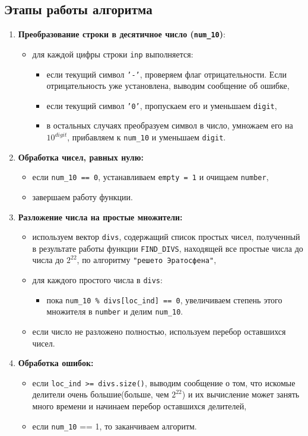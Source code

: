 \subsection*{Этапы работы алгоритма}
\begin{enumerate}
	\item \textbf{Преобразование строки в десятичное число (\texttt{num\_10})}:
	\begin{itemize}
		\item для каждой цифры строки \texttt{inp} выполняется:
		\begin{itemize}
			\item если текущий символ \texttt{'-'}, проверяем флаг отрицательности. Если отрицательность уже установлена, выводим сообщение об ошибке,
			\item если текущий символ \texttt{'0'}, пропускаем его и уменьшаем \texttt{digit},
			\item в остальных случаях преобразуем символ в число, умножаем его на $10^{digit}$, прибавляем к \texttt{num\_10} и уменьшаем \texttt{digit}.
		\end{itemize}
	\end{itemize}
	
	\item \textbf{Обработка чисел, равных нулю:}
	\begin{itemize}
		\item если \texttt{num\_10 == 0}, устанавливаем \texttt{empty = 1} и очищаем \texttt{number},
		\item завершаем работу функции.
	\end{itemize}
	
	\item \textbf{Разложение числа на простые множители:}
	\begin{itemize}
		\item используем вектор \texttt{divs}, содержащий список простых чисел, полученный в результате работы функции \texttt{FIND\_DIVS}, находящей все простые числа до числа до $2^{22}$, по алгоритму \texttt{"решето Эратосфена"},
		\item для каждого простого числа в \texttt{divs}:
		\begin{itemize}
			\item пока \texttt{num\_10 \% divs[loc\_ind] == 0}, увеличиваем степень этого множителя в \texttt{number} и делим \texttt{num\_10}.
		\end{itemize}
		\item если число не разложено полностью, используем перебор оставшихся чисел.
	\end{itemize}
	
	\item \textbf{Обработка ошибок:}
	\begin{itemize}
		\item если \texttt{loc\_ind >= divs.size()}, выводим сообщение о том, что искомые делители очень большие(больше, чем $2^{22}$) и их вычисление может занять много времени и начинаем перебор оставшихся делителей,
		\item если \texttt{num\_10} == 1, то заканчиваем алгоритм.
	\end{itemize}
\end{enumerate}

